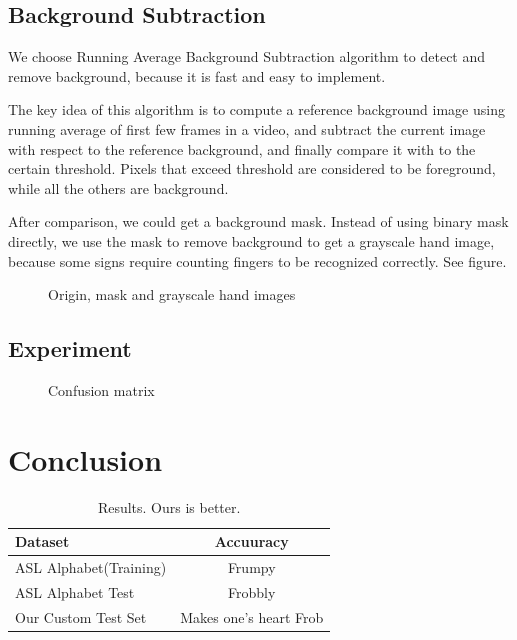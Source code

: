 \documentclass[10pt,twocolumn,letterpaper]{article}
\begin{document}
\subsection{Background Subtraction}

We choose Running Average Background Subtraction algorithm to detect and remove background, because it is fast and easy to implement.

The key idea of this algorithm is to compute a reference background image using running average of first few frames in a video, and subtract the current image with respect to the reference background, and finally compare it with  to the certain threshold. Pixels that exceed threshold are considered to be foreground, while all the others are background.
 
 After comparison, we could get a background mask. Instead of using binary mask directly, we use the mask to remove background to get a grayscale hand image, because some signs require counting fingers to be recognized correctly. See figure. 
 
 \begin{figure}[h]
\begin{center}
\fbox{\rule{0pt}{2in} \rule{0.9\linewidth}{0pt}}
\end{center}
   \caption{Origin, mask and grayscale hand images}
\label{fig:long}
\label{fig:onecol}
\end{figure}


\subsection{Experiment}

\blindtext

\begin{figure}[h]
\begin{center}
\fbox{\rule{0pt}{2in} \rule{0.9\linewidth}{0pt}}
\end{center}
   \caption{Confusion matrix}
\label{fig:long}
\label{fig:onecol}
\end{figure}




\section{Conclusion}
\blindtext

\begin{table}[h]
\begin{center}
\begin{tabular}{|l|c|}
\hline
Dataset & Accuuracy \\
\hline\hline
ASL Alphabet(Training) & Frumpy \\
ASL Alphabet Test & Frobbly \\
Our Custom Test Set & Makes one's heart Frob\\
\hline
\end{tabular}
\end{center}
\caption{Results.   Ours is better.}
\label{table:result}
\end{table}


{\small


}
\end{document}
